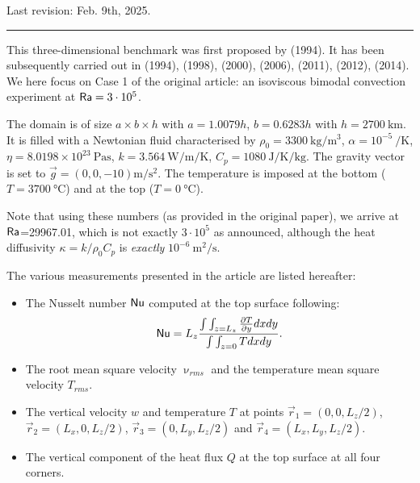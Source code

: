 Last revision: Feb. 9th, 2025.

\par\noindent\rule{\textwidth}{0.4pt}


This three-dimensional benchmark was first proposed by \textcite{bucc94} (1994). 
It has been subsequently carried out in \textcite{tack94} (1994),
\textcite{trha98} (1998), \textcite{albe00} (2000),
\textcite{onmm06} (2006), \textcite{dawk11} (2011), \textcite{krhb12} (2012),
\textcite{thie14} (2014).
We here focus on Case 1 of the original article:  
an isoviscous bimodal convection experiment at ${\mathsf{Ra}}=3\cdot 10^5$.

The domain is of size $a\times b\times h$ with $a=1.0079h$, $b=0.6283h$ 
with $h=\SI{2700}{\km}$. It is filled with a Newtonian fluid 
characterised by $\rho_0=\SI{3300}{\kg\per\cubic\meter}$, 
$\alpha=10^{-5}~\si{\per\kelvin}$, 
$\eta=8.0198\times10^{23}~\si{\pascal\second}$, 
$k=3.564~\si{\watt\per\meter\per\kelvin}$, 
$C_p=1080~\si{\joule\per\kelvin\per\kg}$.
The gravity vector is set to $\vec{g}=(0,0,-10)\si{\meter\per\square\second}$.
The temperature is imposed at the bottom  ($T=3700~\si{\celsius}$) and at the top ($T=0~\si{\celsius}$).

Note that using these numbers (as provided in the original paper), we arrive at ${\mathsf{Ra}}$=29967.01, which 
is not exactly $3\cdot10^5$ as announced, although the heat diffusivity $\kappa=k/\rho_0 C_p$ is 
{\it exactly} $10^{-6}~\si{\square\meter\per\second}$.

The various measurements presented in the article are listed hereafter:
\begin{itemize}
\item The Nusselt number ${\mathsf{Nu}}$ computed at the top surface following:
\[
{\mathsf{Nu}} = L_z \frac{\int\int_{z=L_z} \frac{\partial T}{\partial y} dx dy  }{\int \int_{z=0} T dx dy}.
\]
\item The root mean square velocity $\upnu_{rms}$ and the temperature mean square velocity $T_{rms}$.
\item The vertical velocity $w$ and temperature $T$ at points $\vec{r}_1=(0,0,L_z/2)$, 
$\vec{r}_2=(L_x,0,L_z/2)$, $\vec{r}_3=(0,L_y,L_z/2)$ and $\vec{r}_4=(L_x,L_y,L_z/2)$.
\item The vertical component of the heat flux $Q$ at the top surface  at all four corners. 
\end{itemize}

